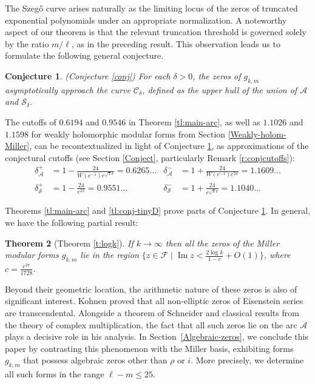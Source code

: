 \documentclass[12pt]{amsart}
\theoremstyle{plain} %
\newtheorem{theoremletter}{Theorem}
\newtheorem{conjectureletter}[theoremletter]{Conjecture}
\theoremstyle{definition}
\theoremstyle{remark}
\numberwithin{equation}{section}
\renewcommand{\Im}{\operatorname{Im}}
\begin{document}
The Szeg\H{o} curve arises naturally as the limiting locus of the zeros of truncated exponential polynomials under an appropriate normalization. A noteworthy aspect of our theorem is that the relevant truncation threshold is governed solely by the ratio $m/\ell$, as in the preceding result. This observation leads us to formulate the following general conjecture.

\begin{conjectureletter}(Conjecture \ref{conj}) \label{cl:conj}
For each $\delta>0$, the zeros of $g_{k,m}$ asymptotically
approach the curve $\mathcal{C}_\delta$, defined as the upper
hull of the union of $\mathcal{A}$ and $\mathcal{S}_\delta$.
\end{conjectureletter}

The cutoffs of $0.6194$ and $0.9546$ in Theorem
\ref{tl:main-arc}, as well as $1.1026$ and $1.1598$ for weakly holomorphic modular forms from Section \ref{Weakly-holom-Miller}, can be recontextualized in light of
Conjecture \ref{cl:conj}, as approximations of the conjectural
cutoffs (see Section \ref{Conject}, particularly Remark \ref{r:conjcutoffs}):
\begin{align*}
  \delta_{\mathcal{A}}^+&=1-\frac{24}{W(e^{-1})e^{\sqrt{3}\pi}}=0.6265\ldots&\delta_{\mathcal{A}}^-&=1+\frac{24}{W(e^{-1})e^{2\pi}}=1.1609\ldots\\
  \delta_{\mathcal{S}}^+&=1-\frac{24}{e^{2\pi}}=0.9551\ldots&\delta_{\mathcal{S}}^-&=1+\frac{24}{e^{\sqrt{3}\pi}}=1.1040\ldots
\end{align*}

Theorems \ref{tl:main-arc} and \ref{tl:conj-tinyD} prove parts of Conjecture \ref{cl:conj}. In general, we have the following partial result:
\begin{theoremletter}[Theorem \ref{t:logk}]
If $k\to \infty$ then all the zeros of the Miller modular forms $g_{k,m}$ lie in the region $\{z\in \mathcal{F}\mid \Im z < \frac{2\log k}{1-c}+O(1)\}$, where $c=\frac{e^{2\pi}}{1728}$.
\end{theoremletter}

Beyond their geometric location, the arithmetic nature of these zeros is also of significant interest. Kohnen \cite{kohnen:eisenstein} proved that all non-elliptic zeros of Eisenstein series are transcendental. Alongside a theorem of Schneider and classical results from the theory of complex multiplication, the fact that all such zeros lie on the arc $\mathcal{A}$ plays a decisive role in his analysis. In Section~\ref{Algebraic-zeros}, we conclude this paper by contrasting this phenomenon with the Miller basis, exhibiting forms $g_{k,m}$ that possess algebraic zeros other than $\rho$ or $i$. More precisely, we determine all such forms in the range $\ell-m\le 25$. 
\end{document}
